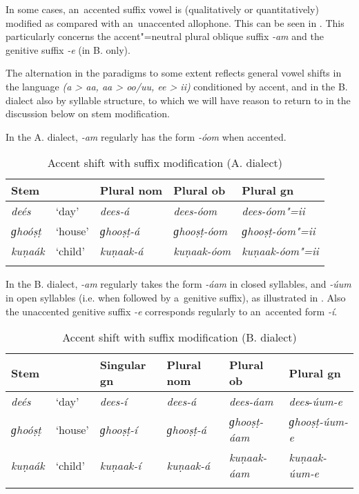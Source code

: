 In some cases, an~accented suffix vowel is (qualitatively or quantitatively) modified as compared
with an~unaccented allophone. This can be seen in . This particularly concerns the
accent"=neutral plural oblique suffix \textit{-am} and the genitive suffix \textit{-e} (in B. only).

The alternation in the paradigms to some extent reflects general vowel shifts in the language
\textit{(a {\textgreater} aa, aa {\textgreater} oo/uu, ee {\textgreater} ii)} conditioned by accent,
and in the B. dialect also by syllable structure, to which we will have reason to return to in the
discussion below on stem modification.

In the A. dialect, \textit{-am} regularly has the form \textit{-óom} when accented.

\begin{table}[ht]
\caption{Accent shift with suffix modification (A. dialect)}
\begin{tabularx}{\textwidth}{ l@{\hspace{20pt}} l@{\hspace{20pt}} Q Q Q }
\lsptoprule
Stem &
&
Plural nom &
Plural ob &
Plural gn \\\hline
\textit{deés} &
`day' &
\textit{dees-á} &
\textit{dees-óom} &
\textit{dees-óom"=ii} \\
\textit{ɡhoóṣṭ} &
`house' &
\textit{ɡhooṣṭ-á} &
\textit{ɡhooṣṭ-óom} &
\textit{ɡhooṣṭ-óom"=ii} \\
\textit{kuṇaák} &
`child' &
\textit{kuṇaak-á} &
\textit{kuṇaak-óom} &
\textit{kuṇaak-óom"=ii} \\\lspbottomrule
\end{tabularx}
\label{tab:3-11}
\end{table}


In the B. dialect, \textit{\--am} regularly takes the form \textit{-áam} in closed syllables, and \textit{-úum} in open syllables (i.e. when followed by a~genitive suffix), as illustrated in . Also the unaccented genitive suffix \textit{-e} corresponds regularly to an~accented form \textit{-í}.



\begin{table}[ht]
\caption{Accent shift with suffix modification (B. dialect)}
\begin{tabularx}{\textwidth}{ Q l l l l l }
\lsptoprule
Stem &
&
Singular gn &
Plural nom &
Plural ob &
Plural gn \\\hline
\textit{deés} &
`day' &
\textit{dees-í} &
\textit{dees-á} &
\textit{dees-áam} &
\textit{dees}-\textit{úum-e}\\
\textit{ɡhoóṣṭ} &
`house' &
\textit{ɡhooṣṭ-í} &
\textit{ɡhooṣṭ-á} &
\textit{ɡhooṣṭ-áam} &
\textit{ɡhooṣṭ-úum-e} \\
\textit{kuṇaák} &
`child' &
\textit{kuṇaak-í} &
\textit{kuṇaak-á} &
\textit{kuṇaak-áam} &
\textit{kuṇaak-úum-e} \\\lspbottomrule
\end{tabularx}
\label{tab:3-12}
\end{table}

